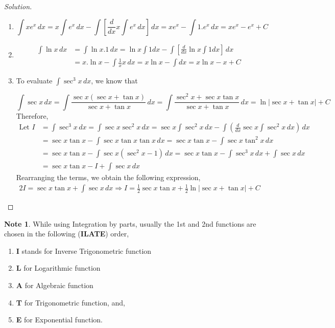 \documentclass{book}
\theoremstyle{definition}
\newtheorem*{note}{Note}
\newenvironment{solution}
    {\begin{proof}[Solution]}
    {\end{proof}}
\begin{document}
\begin{solution}
\begin{enumerate}[label=(\roman*)]

\item 
\[
\int xe^x\,dx = x\int e^x\,dx-\int \left[\frac{d}{dx}x\int e^x\,dx\right]\,dx =xe^x-\int 1.e^x\,dx=xe^x-e^x+C
\]

\item 

\begin{align*}
\int \ln x\,dx&=\int \ln x.1\,dx = \ln x\int 1dx-\int \left[\frac{d}{dx}\ln x\int 1dx\right]\,dx \\
&= x.\ln x-\int \frac{1}{x}x\,dx = x \ln x-\int dx=x\ln x-x+C
\end{align*}





\item To evaluate $\int \sec^3 x\,dx$, we know that 

\[
\int \sec x\,dx=\int \frac{\sec x(\sec x+\tan x)}{\sec x+\tan x}\,dx=\int\frac{\sec^2 x+\sec x\tan x}{\sec x+\tan x}\,dx= \ln \left|\sec x+\tan x\right|+C
\]
Therefore, 
\begin{align*}
\text{Let } I &= \int \sec^3 x\,dx = \int \sec x\sec^2 x\,dx = \sec x\int\sec^2x\,dx-\int \left(\frac{d}{dx}\sec x\int \sec^2 x\,dx\right)\,dx \\
&= \sec x\tan x-\int \sec x\tan x\tan x\,dx = \sec x\tan x-\int \sec x\tan^2 x\,dx \\
&= \sec x\tan x-\int \sec x(\sec^2x-1)\,dx = \sec x\tan x-\int \sec^3 x\,dx+\int\sec x\,dx \\
&= \sec x\tan x-I+\int\sec x\,dx
\end{align*}
Rearranging the terms, we obtain the following expression,
\begin{align*}
    2I=\sec x\tan x+\int\sec x\,dx \Rightarrow I=\frac{1}{2}\sec x\tan x+\frac{1}{2}\ln|\sec x+\tan x|+C
\end{align*}
\end{enumerate}
\end{solution}

\begin{note}
While using Integration by parts, usually the 1st and 2nd functions are chosen in the following (\textbf{ILATE}) order,
\begin{enumerate}
    \item \textbf{I} stands for Inverse Trigonometric function
    \item \textbf{L} for Logarithmic function
    \item \textbf{A} for Algebraic function
    \item \textbf{T} for Trigonometric function, and,
    \item \textbf{E} for Exponential function.
\end{enumerate}
\end{note}
\end{document}
